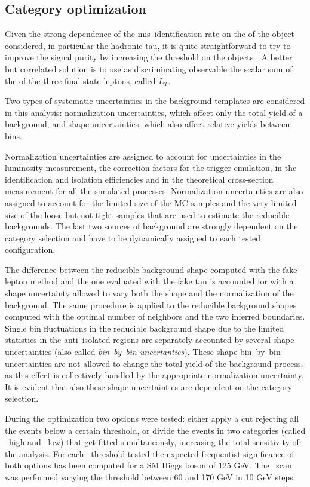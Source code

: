 \subsection{Category optimization}

Given the strong dependence of the mis--identification rate on the \pT of the object considered, in particular the hadronic tau, it is quite straightforward to try to improve the signal purity by increasing the threshold on the objects \pT. A better but correlated solution is to use as discriminating observable the scalar sum of the \pT of the three final state leptons, called $L_T$.  

Two types of systematic uncertainties in the background templates are considered in this analysis: normalization uncertainties, which affect only the total yield of a background, and shape uncertainties, which also affect relative yields between bins.

Normalization uncertainties are assigned to account for uncertainties in the luminosity measurement, the correction factors for the trigger emulation, in the identification and isolation efficiencies and in the theoretical cross-section measurement for all the simulated processes. Normalization uncertainties are also assigned to account for the limited size of the MC samples and the very limited size of the loose-but-not-tight samples that are used to estimate the reducible backgrounds. The last two sources of background are strongly dependent on the category selection and have to be dynamically assigned to each tested configuration.

The difference between the reducible background shape computed with the fake lepton method and the one evaluated with the fake tau is accounted for with a shape uncertainty allowed to vary both the shape and the normalization of the background. The same procedure is applied to the reducible background shapes computed with the optimal number of neighbors and the two inferred boundaries. Single bin fluctuations in the reducible background shape due to the limited statistics in the anti--isolated regions are separately accounted by several shape uncertainties (also called \emph{bin--by--bin uncertanties}). These shape bin--by--bin uncertainties are not allowed to change the total yield of the background process, as this effect is collectively handled by the appropriate normalization uncertainty. It is evident that also these shape uncertainties are dependent on the category selection.

During the optimization two options were tested: either apply a cut rejecting all the events below a certain \LT threshold, or divide the events in two categories (called \LT--high and \LT--low) that get fitted simultaneously, increasing the total sensitivity of the analysis. For each \LT \ threshold tested the expected frequentist significance of both options has been computed for a SM Higgs boson of 125 GeV. The \LT\ scan was performed varying the threshold between 60 and 170 GeV in 10 GeV steps. 

